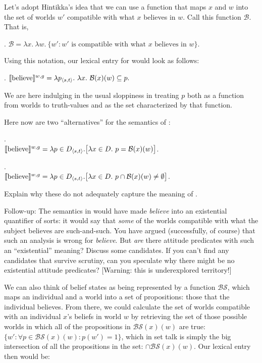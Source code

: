 \begin{exercise}
	
	Let's adopt Hintikka's idea that we can use a function that maps $x$
  and $w$ into the set of worlds $w'$ compatible with what $x$
  believes in $w$. Call this function $\mathcal{B}$. That is,
	
	\ex. $\mathcal{B} = \lambda x.\ \lambda w.\ \{w': w' \mbox{ is compatible with what } x \mbox{ believes in } w\}.$
	
	Using this notation, our lexical entry for 
  would look as follows:
	
	\ex. $\llbracket \mbox{believe} \rrbracket^{w,g} = \lambda p_{\langle s,t \rangle}.\ \lambda x.\ \mathcal{B}(x)(w) \subseteq p.$
	
	We are here indulging in the usual sloppiness in treating $p$ both
  as a function from worlds to truth-values and as the set
  characterized by that function.
	
	Here now are two ``alternatives'' for the semantics of
  :
	
	\ex. \\[3pt]
	$\llbracket \mbox{believe} \rrbracket^{w,g} = \lambda p \in D_{\langle s,t \rangle}. \big[ \lambda x \in D.\ p = \mathcal{B}(x)(w) \big]$.
	
	\ex. \\[3pt]
	$\llbracket \mbox{believe} \rrbracket^{w,g} = \lambda p \in D_{\langle s,t \rangle}. \big[ \lambda x \in D.\ p \cap \mathcal{B}(x)(w) \neq \emptyset \big]$.
	
	Explain why these do not adequately capture the meaning of
  . \eex
\end{exercise}
%
\begin{exercise}
  Follow-up: The semantics in \Last would have made \emph{believe}
  into an existential quantifier of sorts: it would say that
  \emph{some} of the worlds compatible with what the subject believes
  are such-and-such. You have argued (successfully, of course) that
  such an analysis is wrong for \emph{believe}. But \emph{are} there
  attitude predicates with such an ``existential'' meaning? Discuss
  some candidates. If you can't find any candidates that survive
  scrutiny, can you speculate why there might be no existential
  attitude predicates? [Warning: this is underexplored territory!]\eex
\end{exercise}
%
\clearpage We can also think of belief states as being represented by a function
$\mathcal{BS}$, which maps an individual and a world
into a set of propositions: those that the individual believes. From
there, we could calculate the set of worlds compatible with an
individual $x$'s beliefs in world $w$ by retrieving the set of those
possible worlds in which all of the propositions in
$\mathcal{BS}(x)(w)$ are true:
$\{w': \forall p \in \mathcal{BS}(x)(w): p(w') = 1\}$, which in set
talk is simply the big intersection of all the propositions in the
set: $\cap \mathcal{BS}(x)(w)$. Our lexical entry then would be:

